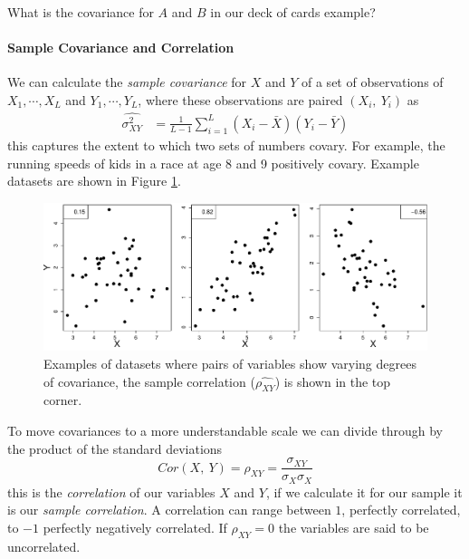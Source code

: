 \begin{question}
What is the covariance for $A$ and $B$ in our deck of cards example? 
\end{question}

\paragraph{Sample Covariance and Correlation} 
We can calculate the \emph{sample covariance} for $X$ and $Y$ of a set of observations
of $X_1, \cdots, X_L$ and $Y_1, \cdots, Y_L$, where these observations
are paired $(X_i,~Y_i)$ as
\begin{align}
 \widehat{\sigma_{XY}^2}  &= \frac{1}{L-1} \sum_{i=1}^L (X_i -
                            \bar{X}) (Y_i - \bar{Y})  %
\end{align}
this captures the extent to which two sets of numbers covary. For
example, the running speeds of kids in a race at age 8 and 9 positively
covary. Example datasets are shown in Figure \ref{Fig:Covar_egs}. 

    \begin{figure}
 \begin{center}
   \includegraphics[width=\textwidth]{math_background/dist_pics/Covar.pdf}\end{center}
 \caption{Examples of datasets where pairs of variables show varying
   degrees of covariance, the sample correlation ($ \widehat{\rho_{XY}}$) is shown in the top corner.
   }\label{Fig:Covar_egs}
 \end{figure}
To move covariances to a more understandable scale we can divide
through by the product of the standard deviations
\begin{equation}
Cor(X,~Y) =\rho_{XY} = \frac{{\sigma_{XY}}}{\sigma_{X} \sigma_{X}}  \label{eqn:def_corr}
\end{equation}
this is the \emph{correlation} of our variables $X$ and $Y$, if we
calculate it for our sample it is our \emph{sample correlation}. A correlation can range between $1$,
perfectly correlated, to $-1$ perfectly negatively correlated. If
$\rho_{XY} =0$ the variables are said to be uncorrelated.


